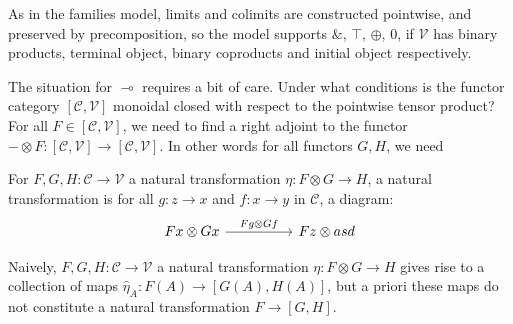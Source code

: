 As in the families model, limits and colimits are constructed pointwise, and preserved by precomposition, so the model supports $\&$, $\top$, $\oplus$, $0$, if $\mathcal{V}$ has binary products, terminal object, binary coproducts and initial object respectively.


The situation for $\multimap$ requires a bit of care. Under what conditions is the functor category $[\mathcal{C}, \mathcal{V}]$ monoidal closed with respect to the pointwise tensor product? For all $F \in [\mathcal{C}, \mathcal{V}]$, we need to find a right adjoint to the functor $- \otimes F : [\mathcal{C},\mathcal{V}] \to [\mathcal{C}, \mathcal{V}]$. In other words for all functors $G, H$, we need 

For $F, G, H : \mathcal{C} \to \mathcal{V}$ a natural transformation $\eta : F \otimes G \to H$, a natural transformation is for all $g : z \to x$ and $f : x \to y$ in $\mathcal{C}$, a diagram:
\[
  \ti
  Fx \otimes Gx  \ar[r, "{Fg \otimes Gf}"] & Fz \otimes asd
  \kz
\]


Naively, $F, G, H : \mathcal{C} \to \mathcal{V}$ a natural transformation $\eta : F \otimes G \to H$ gives rise to a collection of maps $\hat \eta_A : F(A) \to [G(A), H(A)]$, but a priori these maps do not constitute a natural transformation $F \to [G, H]$.


